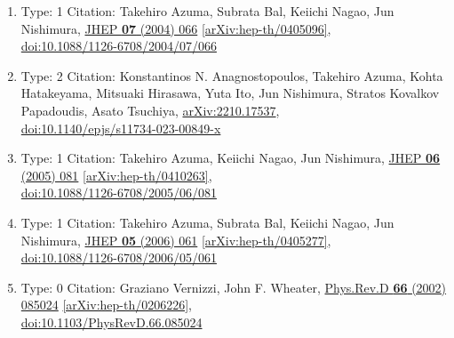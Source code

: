 \documentclass[a4paper,10pt]{article}
\begin{document}
\begin{enumerate}
\begin{enumerate}
  \item Type: 1 Citation: Takehiro Azuma, Subrata Bal, Keiichi Nagao, Jun Nishimura, \href{https://www.doi.org/10.1088/1126-6708/2004/07/066}{JHEP {\bf 07} (2004) 066}  \href{https://arxiv.org/abs/hep-th/0405096}{[arXiv:hep-th/0405096]},\\\href{https://www.doi.org/10.1088/1126-6708/2004/07/066}{doi:10.1088/1126-6708/2004/07/066}
  \item Type: 2 Citation: Konstantinos N. Anagnostopoulos, Takehiro Azuma, Kohta Hatakeyama, Mitsuaki Hirasawa, Yuta Ito, Jun Nishimura, Stratos Kovalkov Papadoudis, Asato Tsuchiya, \href{https://arxiv.org/abs/2210.17537}{arXiv:2210.17537},\\\href{https://www.doi.org/10.1140/epjs/s11734-023-00849-x}{doi:10.1140/epjs/s11734-023-00849-x}
  \item Type: 1 Citation: Takehiro Azuma, Keiichi Nagao, Jun Nishimura, \href{https://www.doi.org/10.1088/1126-6708/2005/06/081}{JHEP {\bf 06} (2005) 081}  \href{https://arxiv.org/abs/hep-th/0410263}{[arXiv:hep-th/0410263]},\\\href{https://www.doi.org/10.1088/1126-6708/2005/06/081}{doi:10.1088/1126-6708/2005/06/081}
  \item Type: 1 Citation: Takehiro Azuma, Subrata Bal, Keiichi Nagao, Jun Nishimura, \href{https://www.doi.org/10.1088/1126-6708/2006/05/061}{JHEP {\bf 05} (2006) 061}  \href{https://arxiv.org/abs/hep-th/0405277}{[arXiv:hep-th/0405277]},\\\href{https://www.doi.org/10.1088/1126-6708/2006/05/061}{doi:10.1088/1126-6708/2006/05/061}
  \item Type: 0 Citation: Graziano Vernizzi, John F. Wheater, \href{https://www.doi.org/10.1103/PhysRevD.66.085024}{Phys.Rev.D {\bf 66} (2002) 085024}  \href{https://arxiv.org/abs/hep-th/0206226}{[arXiv:hep-th/0206226]},\\\href{https://www.doi.org/10.1103/PhysRevD.66.085024}{doi:10.1103/PhysRevD.66.085024}

\end{enumerate}
\end{enumerate}
\end{document}
